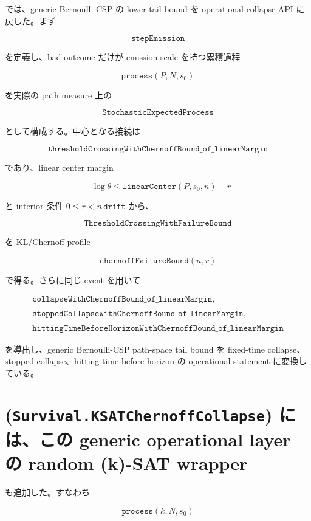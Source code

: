 \documentclass[12pt,a4paper]{article}
\begin{document}
では、generic Bernoulli-CSP の lower-tail bound を operational collapse API に戻した。まず

\[
\texttt{stepEmission}
\]

を定義し、bad outcome だけが emission scale を持つ累積過程

\[
\texttt{process}(P,N,s_0)
\]

を実際の path measure 上の

\[
\texttt{StochasticExpectedProcess}
\]

として構成する。中心となる接続は

\[
\texttt{thresholdCrossingWithChernoffBound\_of\_linearMargin}
\]

であり、linear center margin

\[
-\log\theta \le \texttt{linearCenter}(P,s_0,n)-r
\]

と interior 条件 \(0\le r < n\,\texttt{drift}\) から、

\[
\texttt{ThresholdCrossingWithFailureBound}
\]

を KL/Chernoff profile

\[
\texttt{chernoffFailureBound}(n,r)
\]

で得る。さらに同じ event を用いて

\[
\begin{aligned}
\texttt{collapseWithChernoffBound\_of\_linearMargin}, \\
\quad \\
\texttt{stoppedCollapseWithChernoffBound\_of\_linearMargin}, \\
\quad \\
\texttt{hittingTimeBeforeHorizonWithChernoffBound\_of\_linearMargin}
\end{aligned}
\]

を導出し、generic Bernoulli-CSP path-space tail bound を fixed-time collapse、stopped collapse、hitting-time before horizon の operational statement に変換している。

\section{\texorpdfstring{(\texttt{Survival.KSATChernoffCollapse}) には、この generic operational layer の random (k)-SAT wrapper}{() には、この generic operational layer の random (k)-SAT wrapper}}\label{ux306bux306fux3053ux306e-generic-operational-layer-ux306e-random-k-sat-wrapper}

も追加した。すなわち

\[
\texttt{process}(k,N,s_0)
\]
\end{document}
